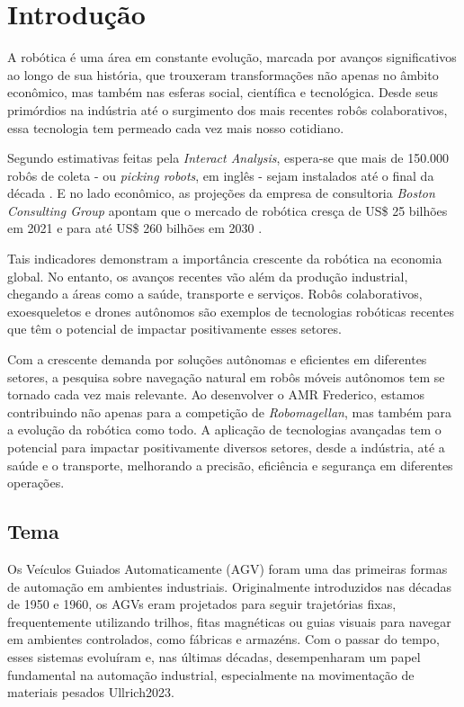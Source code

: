 
\chapter{Introdução}\label{cap:introducao}


A robótica é uma área em constante evolução, marcada por avanços significativos ao longo de sua história, que trouxeram transformações não apenas no âmbito econômico, mas também nas esferas social, científica e tecnológica. Desde seus primórdios na indústria até o surgimento dos mais recentes robôs colaborativos, essa tecnologia tem permeado cada vez mais nosso cotidiano.

Segundo estimativas feitas pela \emph{Interact Analysis}, espera-se que mais de 150.000 robôs de coleta - ou \emph{picking robots}, em inglês - sejam instalados até o final da década \cite{Wessling2023}. E no lado econômico, as projeções da empresa de consultoria \textit{Boston Consulting Group} apontam que o mercado de robótica cresça de US\$ 25 bilhões em 2021 e para até US\$ 260 bilhões em 2030 \cite{Carmen2021}.

Tais indicadores demonstram a importância crescente da robótica na economia global. No entanto, os avanços recentes vão além da produção industrial, chegando a áreas como a saúde, transporte e serviços. Robôs colaborativos, exoesqueletos e drones autônomos são exemplos de tecnologias robóticas recentes que têm o potencial de impactar positivamente esses setores.

Com a crescente demanda por soluções autônomas e eficientes em diferentes setores, a pesquisa sobre navegação natural em robôs móveis autônomos tem se tornado cada vez mais relevante. Ao desenvolver o AMR Frederico, estamos contribuindo não apenas para a competição de \emph{Robomagellan}, mas também para a evolução da robótica como todo. A aplicação de tecnologias avançadas tem o potencial para impactar positivamente diversos setores, desde a indústria, até a saúde e o transporte, melhorando a precisão, eficiência e segurança em diferentes operações.

\section{\textbf{Tema}}
Os Veículos Guiados Automaticamente (AGV) foram uma das primeiras formas de automação em ambientes industriais. Originalmente introduzidos nas décadas de 1950 e 1960, os AGVs eram projetados para seguir trajetórias fixas, frequentemente utilizando trilhos, fitas magnéticas ou guias visuais para navegar em ambientes controlados, como fábricas e armazéns. Com o passar do tempo, esses sistemas evoluíram e, nas últimas décadas, desempenharam um papel fundamental na automação industrial, especialmente na movimentação de materiais pesados {Ullrich2023}.

